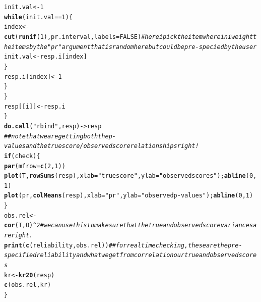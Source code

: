 \documentclass{article}\usepackage[]{graphicx}\usepackage[]{color}
\makeatletter
\newcommand{\hlnum}[1]{\textcolor[rgb]{0.686,0.059,0.569}{#1}}%
\newcommand{\hlstr}[1]{\textcolor[rgb]{0.192,0.494,0.8}{#1}}%
\newcommand{\hlcom}[1]{\textcolor[rgb]{0.678,0.584,0.686}{\textit{#1}}}%
\newcommand{\hlopt}[1]{\textcolor[rgb]{0,0,0}{#1}}%
\newcommand{\hlstd}[1]{\textcolor[rgb]{0.345,0.345,0.345}{#1}}%
\newcommand{\hlkwa}[1]{\textcolor[rgb]{0.161,0.373,0.58}{\textbf{#1}}}%
\newcommand{\hlkwb}[1]{\textcolor[rgb]{0.69,0.353,0.396}{#1}}%
\newcommand{\hlkwc}[1]{\textcolor[rgb]{0.333,0.667,0.333}{#1}}%
\newcommand{\hlkwd}[1]{\textcolor[rgb]{0.737,0.353,0.396}{\textbf{#1}}}%
\newenvironment{kframe}{%
 \def\at@end@of@kframe{}%
 \ifinner\ifhmode%
  \def\at@end@of@kframe{\end{minipage}}%
  \begin{minipage}{\columnwidth}%
 \fi\fi%
 \def\FrameCommand##1{\hskip\@totalleftmargin \hskip-\fboxsep
 \colorbox{shadecolor}{##1}\hskip-\fboxsep
     \hskip-\linewidth \hskip-\@totalleftmargin \hskip\columnwidth}%
 \MakeFramed {\advance\hsize-\width
   \@totalleftmargin\z@ \linewidth\hsize
   \@setminipage}}%
 {\par\unskip\endMakeFramed%
 \at@end@of@kframe}
\newenvironment{knitrout}{}{} %
\makeatother
\begin{document}
\begin{knitrout}
\begin{kframe}
\begin{alltt}
                \hlstd{init.val}\hlkwb{<-}\hlnum{1}
                \hlkwa{while} \hlstd{(init.val}\hlopt{==}\hlnum{1}\hlstd{) \{}
                    \hlstd{index}\hlkwb{<-}\hlkwd{cut}\hlstd{(}\hlkwd{runif}\hlstd{(}\hlnum{1}\hlstd{),pr.interval,}\hlkwc{labels}\hlstd{=}\hlnum{FALSE}\hlstd{)} \hlcom{#here i pick the item wherein i weight the items by the "pr" argument that is random here but could be pre-specied by the user}
                    \hlstd{init.val}\hlkwb{<-}\hlstd{resp.i[index]}
                \hlstd{\}}
                \hlstd{resp.i[index]}\hlkwb{<-}\hlnum{1}
            \hlstd{\}}
        \hlstd{\}}
        \hlstd{resp[[i]]}\hlkwb{<-}\hlstd{resp.i}
    \hlstd{\}}
    \hlkwd{do.call}\hlstd{(}\hlstr{"rbind"}\hlstd{,resp)}\hlkwb{->}\hlstd{resp}
    \hlcom{##note that we are getting both the p-values and the true score/observed score relationships right!}
    \hlkwa{if} \hlstd{(check) \{}
        \hlkwd{par}\hlstd{(}\hlkwc{mfrow}\hlstd{=}\hlkwd{c}\hlstd{(}\hlnum{2}\hlstd{,}\hlnum{1}\hlstd{))}
        \hlkwd{plot}\hlstd{(T,}\hlkwd{rowSums}\hlstd{(resp),}\hlkwc{xlab}\hlstd{=}\hlstr{"true score"}\hlstd{,}\hlkwc{ylab}\hlstd{=}\hlstr{"observed scores"}\hlstd{);} \hlkwd{abline}\hlstd{(}\hlnum{0}\hlstd{,}\hlnum{1}\hlstd{)}
        \hlkwd{plot}\hlstd{(pr,}\hlkwd{colMeans}\hlstd{(resp),}\hlkwc{xlab}\hlstd{=}\hlstr{"pr"}\hlstd{,}\hlkwc{ylab}\hlstd{=}\hlstr{"observed p-values"}\hlstd{);} \hlkwd{abline}\hlstd{(}\hlnum{0}\hlstd{,}\hlnum{1}\hlstd{)}
    \hlstd{\}}
    \hlstd{obs.rel}\hlkwb{<-}\hlkwd{cor}\hlstd{(T,O)}\hlopt{^}\hlnum{2} \hlcom{#we can use this to make sure that the true and observed score variances are right.}
    \hlkwd{print}\hlstd{(}\hlkwd{c}\hlstd{(reliability,obs.rel))} \hlcom{##for real time checking, these are the pre-specified reliability and what we get from correlation our true and observed scores}
    \hlstd{kr}\hlkwb{<-}\hlkwd{kr20}\hlstd{(resp)}
    \hlkwd{c}\hlstd{(obs.rel,kr)}
\hlstd{\}}


\end{alltt}
\end{kframe}
\end{knitrout}
\end{document}
